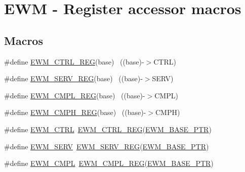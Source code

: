 \hypertarget{group___e_w_m___register___accessor___macros}{}\section{E\+WM -\/ Register accessor macros}
\label{group___e_w_m___register___accessor___macros}
\subsection*{Macros}
\begin{DoxyCompactItemize}
\item 
\#define \hyperlink{group___e_w_m___register___accessor___macros_ga70c97c2b09cf89e94b72c64c3f988fb5}{E\+W\+M\+\_\+\+C\+T\+R\+L\+\_\+\+R\+EG}(base)                                          ~((base)-\/$>$C\+T\+RL)
\item 
\#define \hyperlink{group___e_w_m___register___accessor___macros_ga5a4ece1040c414bead7538079a9f4382}{E\+W\+M\+\_\+\+S\+E\+R\+V\+\_\+\+R\+EG}(base)                                          ~((base)-\/$>$S\+E\+RV)
\item 
\#define \hyperlink{group___e_w_m___register___accessor___macros_ga69212f48d4040eed832bd069e884bd47}{E\+W\+M\+\_\+\+C\+M\+P\+L\+\_\+\+R\+EG}(base)                                          ~((base)-\/$>$C\+M\+PL)
\item 
\#define \hyperlink{group___e_w_m___register___accessor___macros_gaec5eda9deb27ee641ebf5250bb0e1912}{E\+W\+M\+\_\+\+C\+M\+P\+H\+\_\+\+R\+EG}(base)                                          ~((base)-\/$>$C\+M\+PH)
\item 
\#define \hyperlink{group___e_w_m___register___accessor___macros_ga643f3468793754e6d82c2fd8cefb5df7}{E\+W\+M\+\_\+\+C\+T\+RL}~\hyperlink{group___e_w_m___register___accessor___macros_ga70c97c2b09cf89e94b72c64c3f988fb5}{E\+W\+M\+\_\+\+C\+T\+R\+L\+\_\+\+R\+EG}(\hyperlink{group___e_w_m___peripheral_gae3454b5b37183b746362498d1fafc40c}{E\+W\+M\+\_\+\+B\+A\+S\+E\+\_\+\+P\+TR})
\item 
\#define \hyperlink{group___e_w_m___register___accessor___macros_gad5ba7e470596823de41e4970dd7b8dee}{E\+W\+M\+\_\+\+S\+E\+RV}~\hyperlink{group___e_w_m___register___accessor___macros_ga5a4ece1040c414bead7538079a9f4382}{E\+W\+M\+\_\+\+S\+E\+R\+V\+\_\+\+R\+EG}(\hyperlink{group___e_w_m___peripheral_gae3454b5b37183b746362498d1fafc40c}{E\+W\+M\+\_\+\+B\+A\+S\+E\+\_\+\+P\+TR})
\item 
\#define \hyperlink{group___e_w_m___register___accessor___macros_ga80939a724dbc1614712bd9a4e148e95e}{E\+W\+M\+\_\+\+C\+M\+PL}~\hyperlink{group___e_w_m___register___accessor___macros_ga69212f48d4040eed832bd069e884bd47}{E\+W\+M\+\_\+\+C\+M\+P\+L\+\_\+\+R\+EG}(\hyperlink{group___e_w_m___peripheral_gae3454b5b37183b746362498d1fafc40c}{E\+W\+M\+\_\+\+B\+A\+S\+E\+\_\+\+P\+TR})

\end{DoxyCompactItemize}
